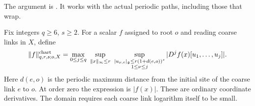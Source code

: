 \documentclass[11pt,reqno]{amsart}
\numberwithin{equation}{section}
\theoremstyle{definition}
\theoremstyle{remark}
\newcommand{\g}{\mathfrak g}
\begin{document}
The argument is \cite[Lemma~16.6 and (16.13),
p.~83]{Main}. It works with the actual periodic
paths, including those that wrap.

Fix integers \(q\ge6\), \(s\ge2\).
For a scalar \(f\) assigned to root \(o\) and
reading coarse links in \(X\), define
\begin{equation}
 \|f\|^{\rm chart}_{q,r,s;o,X}
  =\max_{0\le j\le q}\ 
     \sup_{\|x\|_\infty\le r}\ 
     \sup_{\substack{|u_{\nu,e}|_{\g}\le
                          r(1+d(e,o))^s\\1\le\nu\le j}}
                  |D^jf(x)[u_1,\ldots,u_j]|.
 \label{eq:local-chart-activity-norm}
\end{equation}
Here \(d(e,o)\) is the periodic maximum distance
from the initial site of the coarse link \(e\)
to \(o\). At order zero the expression is
\(|f(x)|\). These are ordinary coordinate
derivatives. The domain requires each coarse
link logarithm itself to be small.
\end{document}
